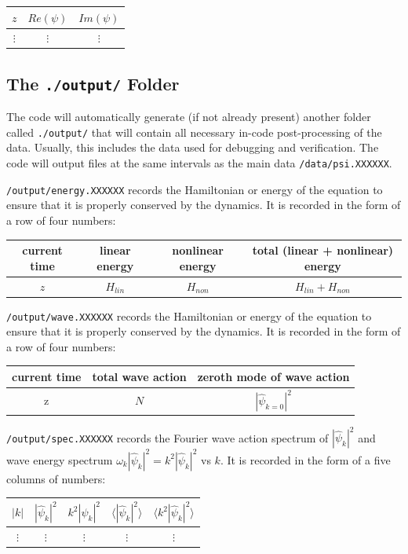 \documentclass[%
 reprint,
superscriptaddress,
aps,
pra,
onecolumn, 
]{revtex4-1}
\begin{document}
\begin{center}
\begin{tabular}{c|c|c}
$z$ & $Re(\psi)$ & $Im(\psi)$\\
\hline
$\vdots$ & $\vdots$ & $\vdots$
\end{tabular}
\end{center}

\subsection{The \texttt{./output/} Folder}

The code will automatically generate (if not already present) another folder called \texttt{./output/} that will contain all necessary in-code post-processing of the data. Usually, this includes the data used for debugging and verification. The code will output files at the same intervals as the main data \texttt{/data/psi.XXXXXX}.

\texttt{/output/energy.XXXXXX} records the Hamiltonian or energy of the equation to ensure that it is properly conserved by the dynamics. It is recorded in the form of a row of four numbers:
\begin{center}
\begin{tabular}{c|c|c|c}
current time & linear energy   & nonlinear energy  & total (linear + nonlinear) energy\\
\hline
$z$ & $H_{lin}$& $H_{non}$ & $H_{lin}+H_{non}$
\end{tabular}
\end{center}

\texttt{/output/wave.XXXXXX} records the Hamiltonian or energy of the equation to ensure that it is properly conserved by the dynamics. It is recorded in the form of a row of four numbers:
\begin{center}
\begin{tabular}{c|c|c}
current time & total wave action & zeroth mode of wave action\\
\hline
z & $N$ & $|\hat{\psi}_{k=0}|^2$
\end{tabular}
\end{center}


\texttt{/output/spec.XXXXXX} records the Fourier wave action spectrum of $|\hat{\psi}_k|^2$ and wave energy spectrum  $\omega_k|\hat{\psi}_k|^2 = k^2|\hat{\psi}_k|^2$ vs $k$. It is recorded in the form of a five columns of numbers:
\begin{center}
\begin{tabular}{c|c|c|c|c}
$|k|$ & $|\hat{\psi}_k|^2$ & $k^2|\hat{\psi}_k|^2$ & $\langle |\hat{\psi}_k|^2 \rangle $ & $\langle k^2|\hat{\psi}_k|^2 \rangle$\\
\hline
$\vdots$ & $\vdots$ & $\vdots$ & $\vdots$ & $\vdots$
\end{tabular}
\end{center}
\end{document}
